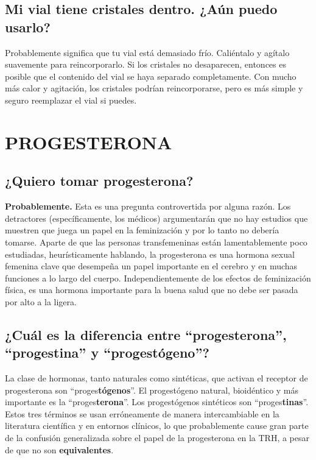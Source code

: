\documentclass{article}
\begin{document}
\subsection{Mi vial tiene cristales dentro. ¿Aún puedo usarlo?}

Probablemente significa que tu vial está demasiado frío. Caliéntalo y agítalo suavemente para reincorporarlo. Si los cristales no desaparecen, entonces es posible que el contenido del vial se haya separado completamente. Con mucho más calor y agitación, los cristales podrían reincorporarse, pero es más simple y seguro reemplazar el vial si puedes.



\section{PROGESTERONA}

\subsection{¿Quiero tomar progesterona?}

\textbf{Probablemente.} Esta es una pregunta controvertida por alguna razón. Los detractores (específicamente, los médicos) argumentarán que no hay estudios que muestren que juega un papel en la feminización y por lo tanto no debería tomarse. Aparte de que las personas transfemeninas están lamentablemente poco estudiadas, heurísticamente hablando, la progesterona es una hormona sexual femenina clave que desempeña un papel importante en el cerebro y en muchas funciones a lo largo del cuerpo. Independientemente de los efectos de feminización física, es una hormona importante para la buena salud que no debe ser pasada por alto a la ligera.

\subsection{¿Cuál es la diferencia entre “progesterona”, “progestina” y “progestógeno”?}

La clase de hormonas, tanto naturales como sintéticas, que activan el receptor de progesterona son “proges\textbf{tógenos}”. El progestógeno natural, bioidéntico y más importante es la “proges\textbf{terona}”. Los progestógenos sintéticos son “proges\textbf{tinas}”. Estos tres términos se usan erróneamente de manera intercambiable en la literatura científica y en entornos clínicos, lo que probablemente cause gran parte de la confusión generalizada sobre el papel de la progesterona en la TRH, a pesar de que no son \textbf{equivalentes}.
\end{document}
